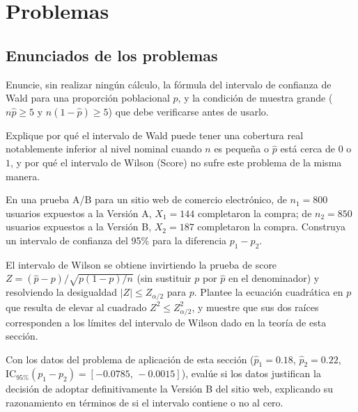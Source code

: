\section*{Problemas}

\subsection*{Enunciados de los problemas}

\begin{problema}
	\label{prob:d02cdce}
	Enuncie, sin realizar ningún cálculo, la fórmula del intervalo de confianza de Wald para una proporción poblacional $p$, y la condición de muestra grande ($n\hat p\ge5$ y $n(1-\hat p)\ge5$) que debe verificarse antes de usarlo.
\end{problema}

\begin{problema}
	\label{prob:8394415}
	Explique por qué el intervalo de Wald puede tener una cobertura real notablemente inferior al nivel nominal cuando $n$ es pequeña o $\hat p$ está cerca de $0$ o $1$, y por qué el intervalo de Wilson (Score) no sufre este problema de la misma manera.
\end{problema}

\begin{problema}
	\label{prob:f92b151}
	En una prueba A/B para un sitio web de comercio electrónico, de $n_1=800$ usuarios expuestos a la Versión A, $X_1=144$ completaron la compra; de $n_2=850$ usuarios expuestos a la Versión B, $X_2=187$ completaron la compra. Construya un intervalo de confianza del 95\% para la diferencia $p_1-p_2$.
\end{problema}

\begin{problema}
	\label{prob:2bf037d}
	El intervalo de Wilson se obtiene invirtiendo la prueba de score $Z=(\hat p-p)/\sqrt{p(1-p)/n}$ (sin sustituir $p$ por $\hat p$ en el denominador) y resolviendo la desigualdad $|Z|\le Z_{\alpha/2}$ para $p$. Plantee la ecuación cuadrática en $p$ que resulta de elevar al cuadrado $Z^2\le Z_{\alpha/2}^2$, y muestre que sus dos raíces corresponden a los límites del intervalo de Wilson dado en la teoría de esta sección.
\end{problema}

\begin{problema}
	\label{prob:816285e}
	Con los datos del problema de aplicación de esta sección ($\hat p_1=0.18$, $\hat p_2=0.22$, $\text{IC}_{95\%}(p_1-p_2)=[-0.0785,\,-0.0015]$), evalúe si los datos justifican la decisión de adoptar definitivamente la Versión B del sitio web, explicando su razonamiento en términos de si el intervalo contiene o no al cero.
\end{problema}

